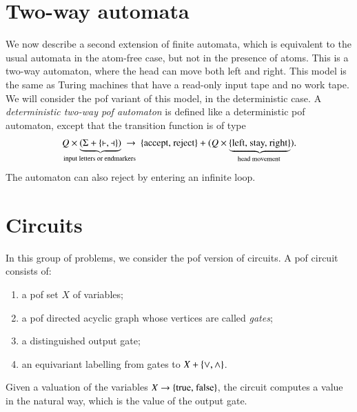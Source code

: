 \section{Two-way automata}
\label{sec:pof-two-way}
We now describe a second extension of finite automata, which is equivalent to the usual automata in the atom-free case, but not in the presence of atoms. This is a two-way automaton,  where the head can move both left and right. This model is the same as Turing machines that have a read-only input tape and no work tape. We will consider the pof variant of this model, in the deterministic case.
A \emph{deterministic two-way pof  automaton} is defined like a deterministic pof automaton, except that the transition function is of type 
\begin{align*}
Q \times 
\myunderbrace{(\Sigma + \set{\vdash,\dashv} )}{input letters or endmarkers}  
\ \to\ 
\set{\text{accept, reject}} + 
(Q \times 
\myunderbrace{\set{\text{left, stay, right}}}{head movement}).
\end{align*}
The automaton can also reject by entering an infinite loop.

\exercisepart


\section{Circuits}
\label{sec:circuits}
In this group of problems, we consider the pof version of circuits.     A pof circuit consists of:
\begin{enumerate}
    \item a pof set $X$ of variables;
    \item a pof directed acyclic graph whose vertices are called  \emph{gates};
    \item a distinguished output gate;
    \item an equivariant labelling from gates to $X + \{\lor,\land\}$.
\end{enumerate}
Given a valuation of the variables $X \to \{\text{true, false}\}$, the circuit computes a value in the natural way, which is the value of the output gate.

\exercisepart




